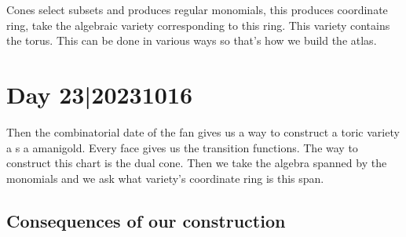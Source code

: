 \documentclass[12pt]{memoir}
\begin{document}
Cones select subsets and produces regular monomials, this produces coordinate ring, take the algebraic variety corresponding to this ring. This variety contains the torus. This can be done in various ways so that's how we build the atlas.

\section{Day 23|20231016}

Then the combinatorial date of the fan gives us a way to construct a toric variety a s a amanigold. Every face gives us the transition functions. The way to construct this chart is the dual cone. Then we take the algebra spanned by the monomials and we ask what variety's coordinate ring is this span. 

\subsection{Consequences of our construction}
\end{document}

